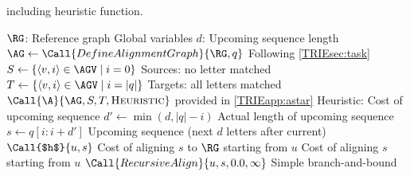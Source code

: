 \begin{algorithm}[t]
	\caption{\astarix including heuristic function.}\label{TRIEalg:astarix}
	\begin{algorithmic}[1]
		\State $\RG$: Reference graph \label{TRIElin:reference}
		\Comment Global variables
		\State $d$: Upcoming sequence length \label{TRIElin:d}
		\Statex
		 \label{TRIElin:astarix}
			\State $\AG \gets \Call{DefineAlignmentGraph}{\RG, q}$
			\Comment Following \cref{TRIEsec:task}
			\State $S \gets \{\langle v,i \rangle \in \AGV \mid i=0 \}$ \label{TRIElin:starts}
			\Comment Sources: no letter matched
			\State $T \gets \{\langle v,i \rangle \in \AGV \mid i=|q| \}$
			\Comment Targets: all letters matched
			\State \Return $\Call{\A}{\AG, S, T, \textsc{Heuristic}}$
			\Comment \A provided in \cref{TRIEapp:astar} \label{TRIElin:ret}
		\EndFunction
		\Statex
		 \label{TRIElin:heuristic-start}
		\Comment Heuristic: Cost of upcoming sequence
			\State $d' \gets \min(d, |q|-i)$
			\Comment Actual length of upcoming sequence
			\State $s \gets q[i:i+d']$ \label{TRIElin:s}
			\Comment Upcoming sequence (next $d$ letters after current)
			\State \Return $\Call{$h$}{u, s}$
			\label{TRIElin:align-upcoming}
			\Comment Cost of aligning $s$ to $\RG$ starting from $u$
		\EndFunction \label{TRIElin:heuristic-end}
		\Statex
		\Comment Cost of aligning $s$ starting from $u$
			\State \Return $\Call{RecursiveAlign}{u, s, 0.0, \infty}$
			\Comment Simple branch-and-bound \label{TRIElin:recursive-align}
		\EndFunction
	\end{algorithmic}
\end{algorithm}